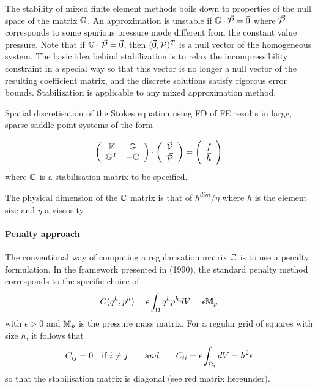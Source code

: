 The stability of mixed finite element methods boils down to properties of the null space of the matrix ${\mathbb{G}}$. 
An approximation is unstable if ${\mathbb{G}} \cdot \vec{\cal P} = \vec{0}$ where $\vec{\cal P}$ 
corresponds to some spurious pressure mode different from the constant value pressure.  
Note that if ${\mathbb{G}}\cdot \vec{\cal P} = \vec{0}$, then $(\vec{0},\vec{\cal P})^T$ is a null vector of 
the homogeneous system. 
The basic idea behind stabilization is to relax the incompressibility constraint in a special way so that 
this vector is no longer a null vector of the resulting coefficient matrix, and 
the discrete solutions satisfy rigorous error bounds. 
Stabilization is applicable to any mixed approximation method. 

Spatial discretisation of the Stokes equation using FD of FE results 
in large, sparse saddle-point systems of the form

\begin{equation}
\left(
\begin{array}{cc}
{\mathbb{K}} & {\mathbb{G}} \\
{\mathbb{G}}^T & -{\mathbb{C}}
\end{array}
\right)
\cdot
\left(
\begin{array}{c}
\vec{\cal V} \\ \vec{\cal P}
\end{array}
\right)
=
\left(
\begin{array}{c}
\vec{f} \\  \vec{h}
\end{array}
\right)
\end{equation}
where ${\mathbb{C}}$ is a stabilisation matrix to be specified.

The physical dimension of the ${\mathbb{C}}$ matrix is that of $h^{dim}/\eta$ where 
$h$ is the element size and $\eta$ a viscosity.



\paragraph{Penalty approach}

The conventional way of computing a regularisation matrix ${\mathbb{C}}$
is to use a penalty formulation.
In the framework presented in \textcite{sike90} (1990), the standard penalty
method corresponds to the specific choice of
\[
C(q^h,p^h)=\epsilon \int_\Omega q^h p^h dV = \epsilon {{\mathbb{M}}}_p
\]
with $\epsilon > 0$ and ${{\mathbb{M}}}_p$ is the pressure mass matrix. 
For a regular grid of squares with size $h$, it follows that 
\[
C_{ij}=0 \quad {\rm if} \; i\neq j
\quad\quad {\text and} \quad\quad
C_{ii}=\epsilon \int_{\Omega_i} dV = h^2 \epsilon
\]
so that the stabilisation matrix is diagonal (see red matrix hereunder).

